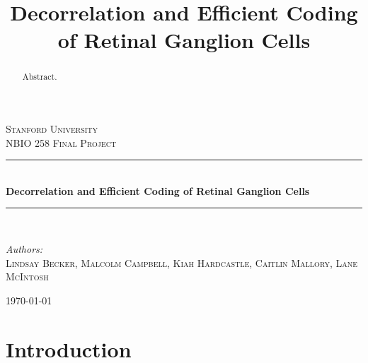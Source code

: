 \documentclass[12pt]{article}
\begin{document}
\begin{titlepage}

\newcommand{\HRule}{\rule{\linewidth}{0.5mm}} %

\center %

\textsc{\LARGE Stanford University}\\[1.5cm] %
\textsc{\Large NBIO 258 Final Project}\\[0.5cm] %

\vspace{3cm}


\HRule \\[0.4cm]
{ \huge \bfseries Decorrelation and Efficient Coding of Retinal Ganglion Cells}\\[0.4cm] %
\HRule \\[1.5cm]
 
\vspace{2cm}

\begin{flushleft} \large
\textit{Authors:}\\
\textsc{Lindsay Becker, Malcolm Campbell, Kiah Hardcastle, Caitlin Mallory, Lane McIntosh} %
\end{flushleft}

\vspace{4cm}



{\large \today}\\[3cm] 

 
 \vfill %

\end{titlepage}

\newpage

\title{Decorrelation and Efficient Coding of Retinal Ganglion Cells}

\begin{abstract}

Abstract.

\end{abstract}



\section{Introduction}
\end{document}
